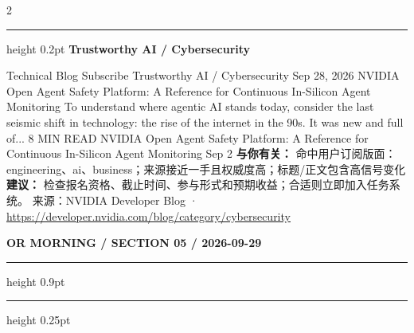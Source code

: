 \documentclass[10.5pt]{ctexart}
\begin{document}
\begin{multicols}{2}
\vspace{2mm}
\hrule height 0.2pt
\vspace{2mm}
{\large\bfseries Trustworthy AI / Cybersecurity}\par
Technical Blog Subscribe Trustworthy AI / Cybersecurity Sep 28, 2026 NVIDIA Open Agent Safety Platform: A Reference for Continuous In-Silicon Agent Monitoring To understand where agentic AI stands today, consider the last seismic shift in technology: the rise of the internet in the 90s. It was new and full of... 8 MIN READ NVIDIA Open Agent Safety Platform: A Reference for Continuous In-Silicon Agent Monitoring Sep 2
\textbf{与你有关：} 命中用户订阅版面：engineering、ai、business；来源接近一手且权威度高；标题/正文包含高信号变化
\textbf{建议：} 检查报名资格、截止时间、参与形式和预期收益；合适则立即加入任务系统。
{\footnotesize\color{ormuted} 来源：NVIDIA Developer Blog · \url{https://developer.nvidia.com/blog/category/cybersecurity}}
\end{multicols}
\newpage
{\small\bfseries OR MORNING / SECTION 05 / 2026-09-29}
\vspace{2mm}
\hrule height 0.9pt
\vspace{1.5mm}
\hrule height 0.25pt
\vspace{4mm}
\end{document}
